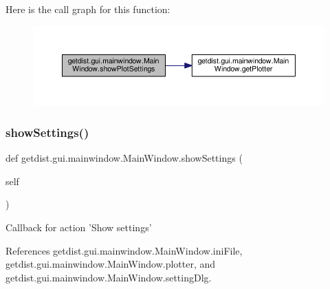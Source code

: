 Here is the call graph for this function\+:
\nopagebreak
\begin{figure}[H]
\begin{center}
\leavevmode
\includegraphics[width=350pt]{classgetdist_1_1gui_1_1mainwindow_1_1MainWindow_aad177b33d62234497a50dea1e81f5401_cgraph}
\end{center}
\end{figure}
\mbox{\label{classgetdist_1_1gui_1_1mainwindow_1_1MainWindow_a89746f2bf22edf5fb8fbb10e586b378f}} 
\subsubsection{\texorpdfstring{show\+Settings()}{showSettings()}}
{\footnotesize\ttfamily def getdist.\+gui.\+mainwindow.\+Main\+Window.\+show\+Settings (\begin{DoxyParamCaption}\item[{}]{self }\end{DoxyParamCaption})}

\begin{DoxyVerb}Callback for action 'Show settings'
\end{DoxyVerb}
 

References getdist.\+gui.\+mainwindow.\+Main\+Window.\+ini\+File, getdist.\+gui.\+mainwindow.\+Main\+Window.\+plotter, and getdist.\+gui.\+mainwindow.\+Main\+Window.\+setting\+Dlg.

\mbox{\label{classgetdist_1_1gui_1_1mainwindow_1_1MainWindow_ae85c5af302ad331e8bef46559bd585fe}} 
